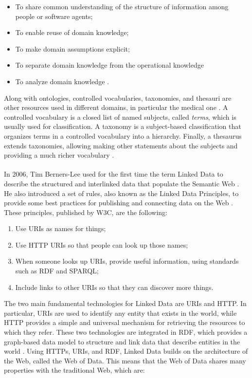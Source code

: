 \begin{itemize}
    \item To share common understanding of the structure of information among people or software agents;
    \item To enable reuse of domain knowledge;
    \item To make domain assumptions explicit;
    \item To separate domain knowledge from the operational knowledge
    \item To analyze domain knowledge \cite{noy2001ontology}.
\end{itemize}

Along with ontologies, controlled vocabularies, taxonomies, and thesauri are other resources used in different domains, in particular the medical one \cite{ivanovic2014overview}. A controlled vocabulary is a closed list of named subjects, called \textit{terms}, which is usually used for classification. A taxonomy is a subject-based classification that organizes terms in a controlled vocabulary into a hierarchy. Finally, a thesaurus extends taxonomies, allowing making other statements about the subjects and providing a much richer vocabulary \cite{ivanovic2014overview}.

\paragraph*{}
In 2006, Tim Berners-Lee used for the first time the term Linked Data to describe the structured and interlinked data that populate the Semantic Web \cite{berners2006linked}. He also introduced a set of rules, also known as the Linked Data Principles, to provide some best practices for publishing and connecting data on the Web \cite{bizer2011linked}. These principles, published by \ac{W3C}, are the following:

\begin{enumerate}
    \item Use \acsp{URI} as names for things;
    \item Use \acs{HTTP} \acsp{URI} so that people can look up those names;
    \item When someone looks up \acsp{URI}, provide useful information, using standards such as \acs{RDF} and \acs{SPARQL};
    \item Include links to other \acsp{URI} so that they can discover more things.
\end{enumerate}

The two main fundamental technologies for Linked Data are \acp{URI} and \ac{HTTP}. In particular, \acp{URI} are used to identify any entity that exists in the world, while \ac{HTTP} provides a simple and universal mechanism for retrieving the resources to which they refer. These two technologies are integrated in \ac{RDF}, which provides a graph-based data model to structure and link data that describe entities in the world \cite{bizer2011linked}. Using \acp{HTTP}, \acp{URI}, and \ac{RDF}, Linked Data builds on the architecture of the Web, called the Web of Data. This means that the Web of Data shares many properties with the traditional Web, which are:

